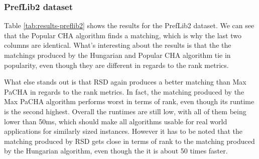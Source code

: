 \subsubsection{PrefLib2 dataset}
\begin{table}[h!]
  \centering
  \caption{Summary of the results for PrefLib2}
  \label{tab:results-preflib2}
\end{table}

Table \ref{tab:results-preflib2} shows the results for the PrefLib2 dataset. We can see that the Popular CHA algorithm finds a matching, which is why the last two columns are identical. What's interesting about the results is that the the matchings produced by the Hungarian and Popular CHA algorithm tie in popularity, even though they are different in regards to the rank metrics. 

What else stands out is that RSD again produces a better matching than Max PaCHA in regards to the rank metrics. In fact, the matching produced by the Max PaCHA algorithm performs worst in terms of rank, even though its runtime is the second highest. Overall the runtimes are still low, with all of them being lower than 50ms, which should make all algorithms usable for real world applications for similarly sized instances. However it has to be noted that the matching produced by RSD gets close in terms of rank to the matching produced by the Hungarian algorithm, even though the it is about 50 times faster.

